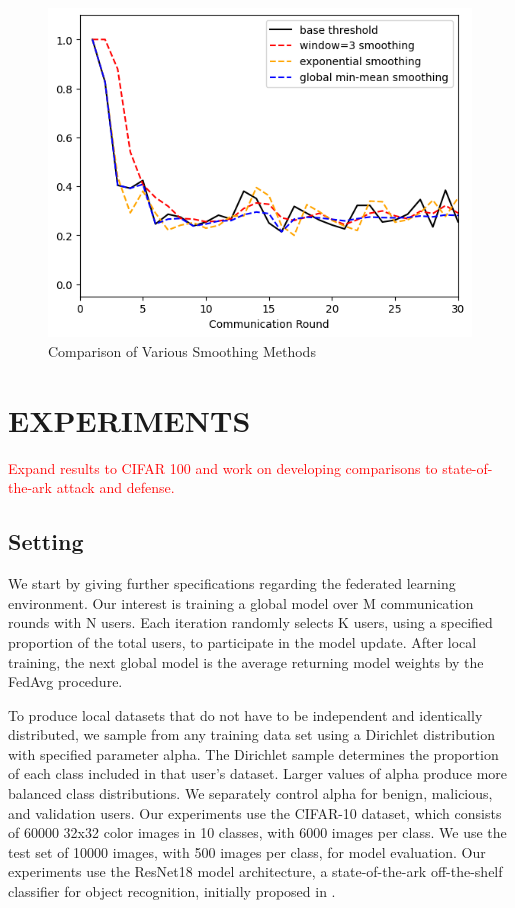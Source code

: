 \documentclass{article} %
\begin{document}
\begin{figure}[H]
    \centering
    
    \includegraphics[width=.5\textwidth]{99_article/99_visuals/extra_plots/min_mean--alpha10000--alpha_val10000--d_rounds30.png}
    \caption{Comparison of Various Smoothing Methods}
    \label{fig:min-mean}
\end{figure}

\section{EXPERIMENTS}

\textcolor{red}{Expand results to CIFAR 100 and work on developing comparisons to state-of-the-ark attack and defense.}

%
\subsection{Setting}

We start by giving further specifications regarding the federated learning environment. Our interest is training a global model over M communication rounds with N users. Each iteration randomly selects K users, using a specified proportion of the total users, to participate in the model update. After local training, the next global model is the average returning model weights by the FedAvg procedure. 

To produce local datasets that do not have to be independent and identically distributed, we sample from any training data set using a Dirichlet distribution with specified parameter alpha. The Dirichlet sample determines the proportion of each class included in that user's dataset. Larger values of alpha produce more balanced class distributions. We separately control alpha for benign, malicious, and validation users. Our experiments use the CIFAR-10 dataset, which consists of 60000 32x32 color images in 10 classes, with 6000 images per class. We use the test set of 10000 images, with 500 images per class, for model evaluation. Our experiments use the ResNet18 model architecture, a state-of-the-ark off-the-shelf classifier for object recognition, initially proposed in \cite{resnet}. 
\end{document}
